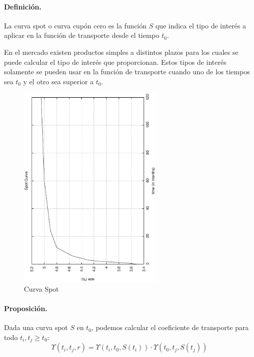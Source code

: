 \paragraph{Definici\'on.} La curva spot o curva cup\'on cero es la funci\'on
$S$ que indica el tipo de inter\'es a aplicar en la funci\'on de transporte
desde el tiempo $t_0$.

En el mercado existen productos simples a distintos plazos para los cuales se 
puede calcular el tipo de inter\'es que proporcionan. Estos tipos de inter\'es
solamente se pueden usar en la funci\'on de transporte cuando uno de los
tiempos sea $t_0$ y el otro sea superior a $t_0$.

\begin{figure}[!hb]
\begin{center}
\includegraphics[height=10cm, angle=-90]{./images/spot.ps}
\caption{Curva Spot}
\label{spot}
\end{center}
\end{figure}

\paragraph{Proposici\'on.} Dada una curva spot $S$ en $t_0$, podemos calcular
el coeficiente de transporte para todo $t_i, t_j \ge t_0$:
\begin{displaymath}
\Upsilon(t_i,t_j, r) = 
\Upsilon(t_i,t_0, S(t_i)) \cdot \Upsilon(t_0,t_j, S(t_j))
\end{displaymath}




